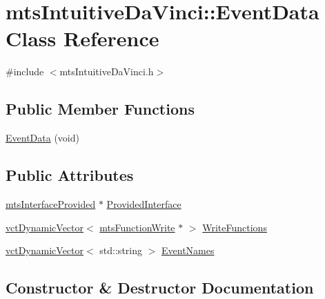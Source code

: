 \hypertarget{classmts_intuitive_da_vinci_1_1_event_data}{}\section{mts\+Intuitive\+Da\+Vinci\+:\+:Event\+Data Class Reference}
\label{classmts_intuitive_da_vinci_1_1_event_data}


{\ttfamily \#include $<$mts\+Intuitive\+Da\+Vinci.\+h$>$}

\subsection*{Public Member Functions}
\begin{DoxyCompactItemize}
\item 
\hyperlink{classmts_intuitive_da_vinci_1_1_event_data_ab57db24d9f627ad6b759d10d1042d61f}{Event\+Data} (void)
\end{DoxyCompactItemize}
\subsection*{Public Attributes}
\begin{DoxyCompactItemize}
\item 
\hyperlink{classmts_interface_provided}{mts\+Interface\+Provided} $\ast$ \hyperlink{classmts_intuitive_da_vinci_1_1_event_data_a8dfa40ab4f12242f85d2072cae184fd1}{Provided\+Interface}
\item 
\hyperlink{classvct_dynamic_vector}{vct\+Dynamic\+Vector}$<$ \hyperlink{classmts_function_write}{mts\+Function\+Write} $\ast$ $>$ \hyperlink{classmts_intuitive_da_vinci_1_1_event_data_a58379f1c62378447780d1b5a7017be47}{Write\+Functions}
\item 
\hyperlink{classvct_dynamic_vector}{vct\+Dynamic\+Vector}$<$ std\+::string $>$ \hyperlink{classmts_intuitive_da_vinci_1_1_event_data_a6d5590c5e9e669ac7e53bbe75fea5955}{Event\+Names}
\end{DoxyCompactItemize}


\subsection{Constructor \& Destructor Documentation}
\hypertarget{classmts_intuitive_da_vinci_1_1_event_data_ab57db24d9f627ad6b759d10d1042d61f}{}

